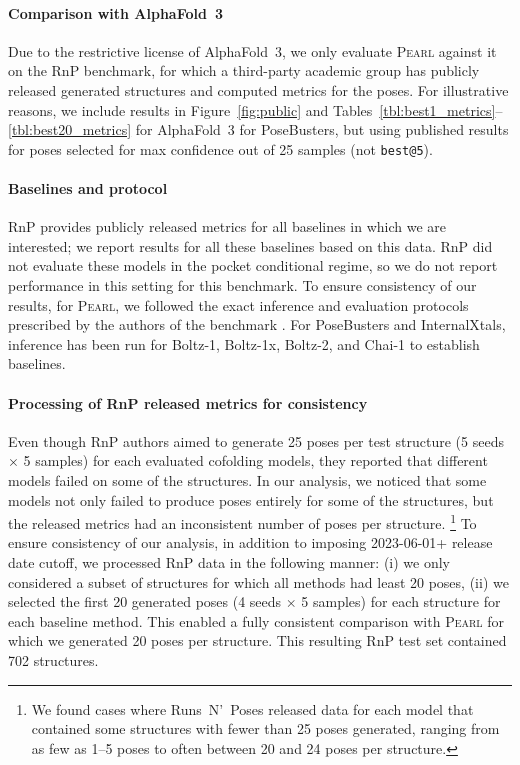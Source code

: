 \documentclass[11pt, letterpaper, onecolumn]{tau-class/tau}
\makeatletter
\newcommand{\pearl}{\textsc{Pearl}\xspace}
\newcommand{\alphafold}[1]{AlphaFold~#1\xspace}
\newcommand{\boltz}[1]{\mbox{Boltz-#1\xspace}}
\newcommand{\chai}[1]{\mbox{Chai-#1\xspace}}
\newcommand{\best}[1]{\texttt{best@#1}\xspace}
\newcommand{\runsnposes}{Runs~N'~Poses\xspace}
\newcommand{\rnp}{RnP\xspace}
\newcommand{\posebusters}{PoseBusters\xspace}
\newcommand{\internalxtals}{InternalXtals\xspace}
\newcommand{\fmtdate}[1]{\mbox{#1\xspace}}
\makeatother
\begin{document}
\paragraph{Comparison with \alphafold3}
Due to the restrictive license of \alphafold3, we only evaluate \pearl against it on the \rnp benchmark, for which a third-party academic group has publicly released generated structures and computed metrics for the poses. For illustrative reasons, we include results in Figure~\ref{fig:public} and Tables~\ref{tbl:best1_metrics}--\ref{tbl:best20_metrics} for \alphafold3 for \posebusters, but using published results for poses selected for max confidence out of 25 samples (not \best5). 

\paragraph{Baselines and protocol}
\rnp provides publicly released metrics for all baselines in which we are interested; we report results for all these baselines based on this data. \rnp did not evaluate these models in the pocket conditional regime, so we do not report performance in this setting for this benchmark.
To ensure consistency of our results, for \pearl, we followed the exact inference and evaluation protocols prescribed by the authors of the benchmark \cite{vskrinjar2025have}.
For \posebusters and \internalxtals, inference has been run for \boltz1, \boltz1x, \boltz2, and \chai1 to establish baselines.

\paragraph{Processing of \rnp released metrics for consistency}
Even though \rnp authors aimed to generate 25 poses per test structure (5 seeds $\times$ 5 samples) for each evaluated cofolding models, they reported that different models failed on some of the structures.
In our analysis, we noticed that some models not only failed to produce poses entirely for some of the structures, but the released metrics had an inconsistent number of poses per structure.%
\footnote{\footnotesize We found cases where \runsnposes released data for each model that contained some structures with fewer than 25 poses generated, ranging from as few as 1--5 poses to often between 20 and 24 poses per structure.}
To ensure consistency of our analysis, in addition to imposing \fmtdate{2023-06-01+} release date cutoff, we processed \rnp data in the following manner: (i) we only considered a subset of structures for which all methods had least 20 poses, (ii) we selected the first 20 generated poses (4 seeds $\times$ 5 samples) for each structure for each baseline method.
This enabled a fully consistent comparison with \pearl for which we generated 20 poses per structure.
This resulting \rnp test set contained 702 structures.
\end{document}
